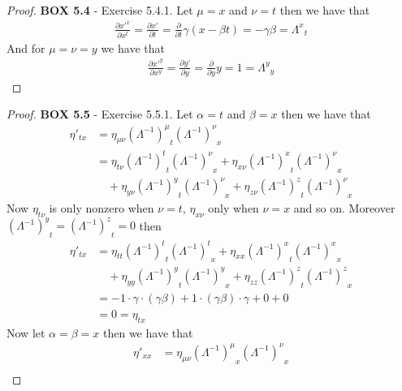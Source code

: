 \documentclass[11pt]{article}
\theoremstyle{definition}
\begin{document}
\begin{proof}{\textbf{BOX 5.4} - Exercise 5.4.1.}
    Let $\mu=x$ and $\nu=t$ then we have that
    \begin{align*}
        \frac{\partial x'^{x}}{\partial x^t}
        = \frac{\partial x'}{\partial t}
        = \frac{\partial}{\partial t}\gamma(x-\beta t)
        = -\gamma\beta
        = {\Lambda^x}_t
    \end{align*}
    And for $\mu=\nu=y$ we have that
    \begin{align*}
        \frac{\partial x'^{y}}{\partial x^y}
        = \frac{\partial y'}{\partial y}
        = \frac{\partial}{\partial y}y
        = 1
        = {\Lambda^y}_y
    \end{align*}
\end{proof}
\cleardoublepage
\begin{proof}{\textbf{BOX 5.5} - Exercise 5.5.1.}
    Let $\alpha=t$ and $\beta=x$ then we have that
    \begin{align*}
        \eta'_{tx} &= \eta_{\mu\nu} {(\Lambda^{-1})^{\mu}}_{t} {(\Lambda^{-1})^{\nu}}_{x}\\
        &= \eta_{t\nu}{(\Lambda^{-1})^{t}}_{t} {(\Lambda^{-1})^{\nu}}_{x}
        + \eta_{x\nu}{(\Lambda^{-1})^{x}}_{t} {(\Lambda^{-1})^{\nu}}_{x}\\
        &\quad + \eta_{y\nu}{(\Lambda^{-1})^{y}}_{t} {(\Lambda^{-1})^{\nu}}_{x}
        + \eta_{z\nu}{(\Lambda^{-1})^{z}}_{t} {(\Lambda^{-1})^{\nu}}_{x}
    \end{align*}
    Now $\eta_{t\nu}$ is only nonzero when $\nu = t$, $\eta_{x\nu}$ only when
    $\nu = x$ and so on. Moreover
    ${(\Lambda^{-1})^y}_t = {(\Lambda^{-1})^z}_t = 0$ then
    \begin{align*}
        \eta'_{tx}
        &= \eta_{tt}{(\Lambda^{-1})^{t}}_{t} {(\Lambda^{-1})^{t}}_{x}
        + \eta_{xx}{(\Lambda^{-1})^{x}}_{t} {(\Lambda^{-1})^{x}}_{x}\\
        &\quad + \eta_{yy}{(\Lambda^{-1})^{y}}_{t} {(\Lambda^{-1})^{y}}_{x}
        + \eta_{zz}{(\Lambda^{-1})^{z}}_{t} {(\Lambda^{-1})^{z}}_{x}\\
        &= -1\cdot \gamma \cdot (\gamma \beta)
        + 1\cdot (\gamma \beta)\cdot \gamma + 0 + 0\\
        &= 0 = \eta_{tx}
    \end{align*}
    Now let $\alpha=\beta=x$ then we have that
    \begin{align*}
        \eta'_{xx} &= \eta_{\mu\nu} {(\Lambda^{-1})^{\mu}}_{x} {(\Lambda^{-1})^{\nu}}_{x}\\

\end{align*}
\end{proof}
\end{document}
